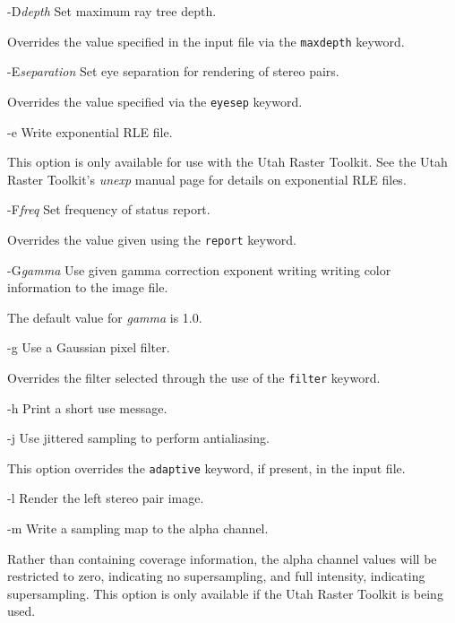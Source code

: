 \begin{defkey}{-D}{{\em depth}}
	Set maximum ray tree depth.
\end{defkey}
Overrides the value specified in the input file via the {\tt maxdepth}
keyword.

\begin{defkey}{-E}{{\em separation}}
	Set eye separation for rendering of stereo pairs.
\end{defkey}
Overrides the value specified via the {\tt eyesep} keyword.

\begin{defkey}{-e}{}
	Write exponential RLE file.
\end{defkey}
This option is only available for use with the Utah Raster Toolkit.
See the Utah Raster Toolkit's {\em unexp} manual page for details on
exponential RLE files.

\begin{defkey}{-F}{{\em freq}}
	Set frequency of status report.
\end{defkey}
Overrides the value given using the {\tt report} keyword.

\begin{defkey}{-G}{{\em gamma}}
	Use given gamma correction exponent writing writing
	color information to the image file.
\end{defkey}
The default value for {\em gamma} is 1.0.

\begin{defkey}{-g}{}
	Use a Gaussian pixel filter.
\end{defkey}
Overrides the filter selected through the use of the {\tt filter}
keyword.

\begin{defkey}{-h}{}
	Print a short use message.
\end{defkey}

\begin{defkey}{-j}{}
	Use jittered sampling to perform antialiasing.
\end{defkey}
This option overrides the {\tt adaptive} keyword, if present,
in the input file.

\begin{defkey}{-l}{}
	Render the left stereo pair image.
\end{defkey}

\begin{defkey}{-m}{}
	Write a sampling map to the alpha channel.
\end{defkey}
Rather than containing coverage information, the alpha channel values
will be restricted to zero, indicating no supersampling, and full intensity,
indicating supersampling.  This option is only available if the Utah
Raster Toolkit is being used.

